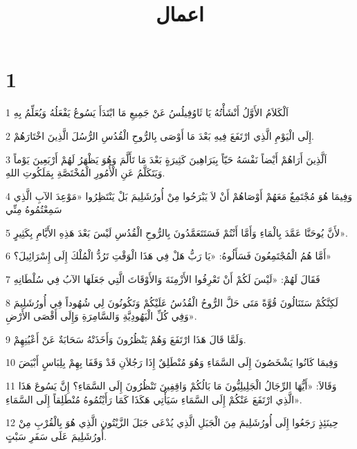 

\title{اعمال}


\chapter{1}

\par 1 اَلْكَلاَمُ الأَوَّلُ أَنْشَأْتُهُ يَا ثَاوُفِيلُسُ عَنْ جَمِيعِ مَا ابْتَدَأَ يَسُوعُ يَفْعَلُهُ وَيُعَلِّمُ بِهِ
\par 2 إِلَى الْيَوْمِ الَّذِي ارْتَفَعَ فِيهِ بَعْدَ مَا أَوْصَى بِالرُّوحِ الْقُدُسِ الرُّسُلَ الَّذِينَ اخْتَارَهُمْ.
\par 3 اَلَّذِينَ أَرَاهُمْ أَيْضاً نَفْسَهُ حَيّاً بِبَرَاهِينَ كَثِيرَةٍ بَعْدَ مَا تَأَلَّمَ وَهُوَ يَظْهَرُ لَهُمْ أَرْبَعِينَ يَوْماً وَيَتَكَلَّمُ عَنِ الْأُمُورِ الْمُخْتَصَّةِ بِمَلَكُوتِ اللهِ.
\par 4 وَفِيمَا هُوَ مُجْتَمِعٌ مَعَهُمْ أَوْصَاهُمْ أَنْ لاَ يَبْرَحُوا مِنْ أُورُشَلِيمَ بَلْ يَنْتَظِرُوا «مَوْعِدَ الآبِ الَّذِي سَمِعْتُمُوهُ مِنِّي
\par 5 لأَنَّ يُوحَنَّا عَمَّدَ بِالْمَاءِ وَأَمَّا أَنْتُمْ فَسَتَتَعَمَّدُونَ بِالرُّوحِ الْقُدُسِ لَيْسَ بَعْدَ هَذِهِ الأَيَّامِ بِكَثِيرٍ».
\par 6 أَمَّا هُمُ الْمُجْتَمِعُونَ فَسَأَلُوهُ: «يَا رَبُّ هَلْ فِي هَذَا الْوَقْتِ تَرُدُّ الْمُلْكَ إِلَى إِسْرَائِيلَ؟»
\par 7 فَقَالَ لَهُمْ: «لَيْسَ لَكُمْ أَنْ تَعْرِفُوا الأَزْمِنَةَ وَالأَوْقَاتَ الَّتِي جَعَلَهَا الآبُ فِي سُلْطَانِهِ
\par 8 لَكِنَّكُمْ سَتَنَالُونَ قُوَّةً مَتَى حَلَّ الرُّوحُ الْقُدُسُ عَلَيْكُمْ وَتَكُونُونَ لِي شُهُوداً فِي أُورُشَلِيمَ وَفِي كُلِّ الْيَهُودِيَّةِ وَالسَّامِرَةِ وَإِلَى أَقْصَى الأَرْضِ».
\par 9 وَلَمَّا قَالَ هَذَا ارْتَفَعَ وَهُمْ يَنْظُرُونَ وَأَخَذَتْهُ سَحَابَةٌ عَنْ أَعْيُنِهِمْ.
\par 10 وَفِيمَا كَانُوا يَشْخَصُونَ إِلَى السَّمَاءِ وَهُوَ مُنْطَلِقٌ إِذَا رَجُلاَنِ قَدْ وَقَفَا بِهِمْ بِلِبَاسٍ أَبْيَضَ
\par 11 وَقَالاَ: «أَيُّهَا الرِّجَالُ الْجَلِيلِيُّونَ مَا بَالُكُمْ وَاقِفِينَ تَنْظُرُونَ إِلَى السَّمَاءِ؟ إِنَّ يَسُوعَ هَذَا الَّذِي ارْتَفَعَ عَنْكُمْ إِلَى السَّمَاءِ سَيَأْتِي هَكَذَا كَمَا رَأَيْتُمُوهُ مُنْطَلِقاً إِلَى السَّمَاءِ».
\par 12 حِينَئِذٍ رَجَعُوا إِلَى أُورُشَلِيمَ مِنَ الْجَبَلِ الَّذِي يُدْعَى جَبَلَ الزَّيْتُونِ الَّذِي هُوَ بِالْقُرْبِ مِنْ أُورُشَلِيمَ عَلَى سَفَرِ سَبْتٍ.
